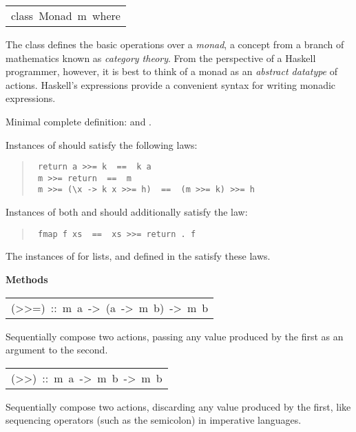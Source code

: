 \begin{haddockdesc}
\item[\begin{tabular}{@{}l}
class\ Monad\ m\ where
\end{tabular}]\haddockbegindoc
The  class defines the basic operations over a \emph{monad},
a concept from a branch of mathematics known as \emph{category theory}.
From the perspective of a Haskell programmer, however, it is best to
think of a monad as an \emph{abstract datatype} of actions.
Haskell's  expressions provide a convenient syntax for writing
monadic expressions.
\par
Minimal complete definition: \haddockid{>>=} and .
\par
Instances of  should satisfy the following laws:
\par
\begin{quote}
{\haddockverb\begin{verbatim}
 return a >>= k  ==  k a
 m >>= return  ==  m
 m >>= (\x -> k x >>= h)  ==  (m >>= k) >>= h
\end{verbatim}}
\end{quote}
Instances of both  and  should additionally satisfy the law:
\par
\begin{quote}
{\haddockverb\begin{verbatim}
 fmap f xs  ==  xs >>= return . f
\end{verbatim}}
\end{quote}
The instances of  for lists,  and 
defined in the  satisfy these laws.
\par

\haddockpremethods{}\textbf{Methods}
\begin{haddockdesc}
\item[\begin{tabular}{@{}l}
(>>=)\ ::\ m\ a\ ->\ (a\ ->\ m\ b)\ ->\ m\ b
\end{tabular}]\haddockbegindoc
Sequentially compose two actions, passing any value produced
 by the first as an argument to the second.
\par

\end{haddockdesc}
\begin{haddockdesc}
\item[\begin{tabular}{@{}l}
(>>)\ ::\ m\ a\ ->\ m\ b\ ->\ m\ b
\end{tabular}]\haddockbegindoc
Sequentially compose two actions, discarding any value produced
 by the first, like sequencing operators (such as the semicolon)
 in imperative languages.
\par


\end{haddockdesc}
\end{haddockdesc}
